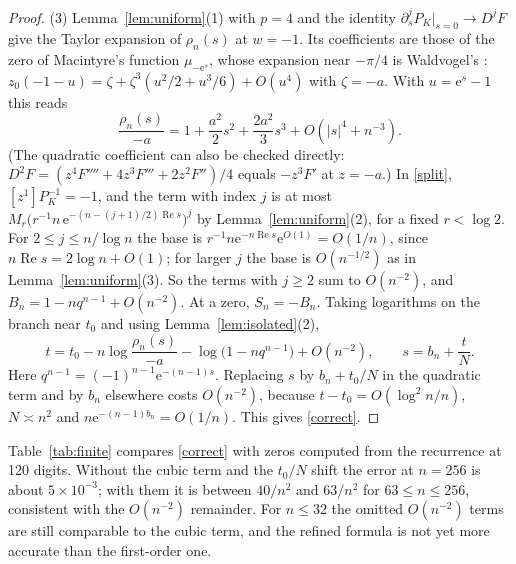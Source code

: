 \documentclass[11pt,a4paper]{article}
\theoremstyle{remark}
\newcommand{\coef}[1]{[z^{#1}]}
\newcommand{\e}{\mathrm e}
\newcommand{\Rea}{\operatorname{Re}}
\begin{document}
\begin{proof}
(3) Lemma~\ref{lem:uniform}(1) with $p=4$ and the identity $\partial_s^jP_K|_{s=0}\to D^jF$ give the Taylor expansion of $\rho_n(s)$ at $w=-1$. Its coefficients are those of the zero of Macintyre's function $\mu_{-\e^{s}}$, whose expansion near $-\pi/4$ is Waldvogel's \cite[eq.~(3)]{Wald}: $z_0(-1-u)=\zeta+\zeta^3(u^2/2+u^3/6)+O(u^4)$ with $\zeta=-a$. With $u=\e^s-1$ this reads
\[
\frac{\rho_n(s)}{-a}=1+\frac{a^2}{2}s^2+\frac{2a^2}{3}s^3+O(|s|^4+n^{-3}).
\]
(The quadratic coefficient can also be checked directly: $D^2F=(z^4F''''+4z^3F'''+2z^2F'')/4$ equals $-z^3F'$ at $z=-a$.) In \eqref{split}, $\coef1P_K^{-1}=-1$, and the term with index $j$ is at most $M_r\bigl(r^{-1}n\,\e^{-(n-(j+1)/2)\Rea s}\bigr)^j$ by Lemma~\ref{lem:uniform}(2), for a fixed $r<\log2$. For $2\le j\le n/\log n$ the base is $r^{-1}n\e^{-n\Rea s}\e^{O(1)}=O(1/n)$, since $n\Rea s=2\log n+O(1)$; for larger $j$ the base is $O(n^{-1/2})$ as in Lemma~\ref{lem:uniform}(3). So the terms with $j\ge2$ sum to $O(n^{-2})$, and $B_n=1-nq^{n-1}+O(n^{-2})$. At a zero, $S_n=-B_n$. Taking logarithms on the branch near $t_0$ and using Lemma~\ref{lem:isolated}(2),
\[
t=t_0-n\log\frac{\rho_n(s)}{-a}-\log\bigl(1-nq^{n-1}\bigr)+O(n^{-2}),\qquad s=b_n+\frac tN .
\]
Here $q^{n-1}=(-1)^{n-1}\e^{-(n-1)s}$. Replacing $s$ by $b_n+t_0/N$ in the quadratic term and by $b_n$ elsewhere costs $O(n^{-2})$, because $t-t_0=O(\log^2 n/n)$, $N\asymp n^2$ and $n\e^{-(n-1)b_n}=O(1/n)$. This gives \eqref{correct}.
\end{proof}

Table~\ref{tab:finite} compares \eqref{correct} with zeros computed from the recurrence at 120 digits. Without the cubic term and the $t_0/N$ shift the error at $n=256$ is about $5\times10^{-3}$; with them it is between $40/n^2$ and $63/n^2$ for $63\le n\le256$, consistent with the $O(n^{-2})$ remainder. For $n\le32$ the omitted $O(n^{-2})$ terms are still comparable to the cubic term, and the refined formula is not yet more accurate than the first-order one.
\end{document}
